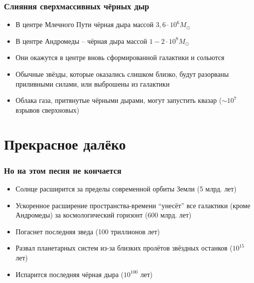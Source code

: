 \documentclass[aspectratio=169]{beamer}
\begin{document}
\begin{frame}
\frametitle{Слияния сверхмассивных чёрных дыр}
\begin{itemize}
\item В центре Млечного Пути чёрная дыра массой $3,6 \cdot 10^6 M_\odot$
\item В центре Андромеды -- чёрная дыра массой $1 - 2 \cdot 10^8 M_\odot$
\item Они окажутся в центре вновь сформированной галактики и сольются
\item Обычные звёзды, которые оказались слишком близко, будут разорваны приливными силами, или выброшены из галактики
\item Облака газа, притянутые чёрными дырами, могут запустить квазар ($\sim 10^7$ взрывов сверхновых)
\end{itemize}
\end{frame}

\section{Прекрасное далёко}
\begin{frame}
\frametitle{Но на этом песня не кончается}
\begin{itemize}
\item Солнце расширится за пределы современной орбиты Земли (5 млрд. лет)
\item Ускоренное расширение пространства-времени ``унесёт'' все галактики (кроме Андромеды) за космологический горизонт (600 млрд. лет)
\item Погаснет последняя зведа (100 триллионов лет)
\item Развал планетарных систем из-за близких пролётов звёздных останков ($10^{15}$ лет)
\item Испарится последняя чёрная дыра ($10^{100}$ лет)
\end{itemize}
\end{frame}
\end{document}
